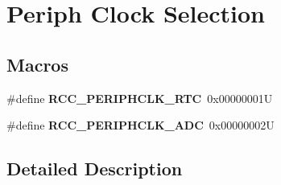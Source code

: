 \hypertarget{group___r_c_c_ex___periph___clock___selection}{}\section{Periph Clock Selection}
\label{group___r_c_c_ex___periph___clock___selection}
\subsection*{Macros}
\begin{DoxyCompactItemize}
\item 
\mbox{\label{group___r_c_c_ex___periph___clock___selection_gaede03aaafb5319bb39767bf50182406f}} 
\#define {\bfseries R\+C\+C\+\_\+\+P\+E\+R\+I\+P\+H\+C\+L\+K\+\_\+\+R\+TC}~0x00000001U
\item 
\mbox{\label{group___r_c_c_ex___periph___clock___selection_gaa234e496ace2f188b106dc15a95ed6bc}} 
\#define {\bfseries R\+C\+C\+\_\+\+P\+E\+R\+I\+P\+H\+C\+L\+K\+\_\+\+A\+DC}~0x00000002U
\end{DoxyCompactItemize}


\subsection{Detailed Description}
